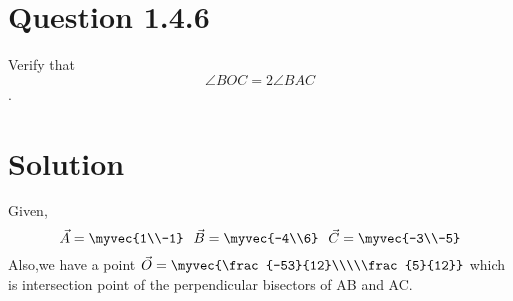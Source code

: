 \documentclass[journal,12pt,twocolumn]{IEEEtran}
\theoremstyle{remark}
\begin{document}
\section{Question 1.4.6}
Verify that$$\angle{BOC} = 2\angle{BAC}$$.

\section{Solution}
\vspace{0.5cm}
Given,$$\vec{A}=\myvec{1\\-1}
\hspace{0.25cm}
\vec{B}=\myvec{-4\\6}
\hspace{0.25cm}
\vec{C}=\myvec{-3\\-5}$$
Also,we have a point $\vec{O}=\myvec{\frac{-53}{12}\\\\\frac{5}{12}}$ 
which is intersection point of the perpendicular bisectors of AB and AC.
\vspace{0.25cm}
\end{document}
